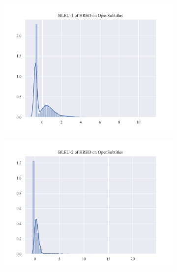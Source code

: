 \begin{figure}
    \begin{subfigure}{0.5\linewidth}
        \centering
        \includegraphics[width=\linewidth]{figure/distplot/opensub/hred/bleu_1/plot.pdf}
    \end{subfigure}%
    \begin{subfigure}{0.5\linewidth}
        \centering
        \includegraphics[width=\linewidth]{figure/distplot/opensub/hred/bleu_2/plot.pdf}
    \end{subfigure}
    \begin{subfigure}{0.5\linewidth}
        \centering

\end{subfigure}
\end{figure}
